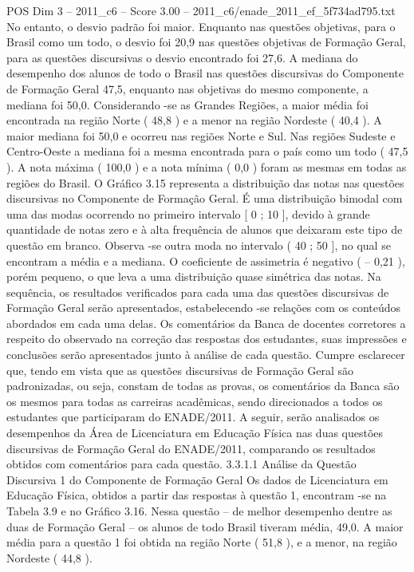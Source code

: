 \begin{textsample}{POS Dim 3 – 2011\_c6 – Score 3.00 – 2011\_c6/enade\_2011\_ef\_5f734ad795.txt}
No entanto, o desvio padrão foi maior.
Enquanto nas questões objetivas, para o Brasil como um todo, o desvio foi 20,9 nas questões objetivas de Formação Geral, para as questões discursivas o desvio encontrado foi 27,6.
A mediana do desempenho dos alunos de todo o Brasil nas questões discursivas do Componente de Formação Geral 47,5, enquanto nas objetivas do mesmo componente, a mediana foi 50,0.
Considerando -se as Grandes Regiões, a maior média foi encontrada na região Norte ( 48,8 ) e a menor na região Nordeste ( 40,4 ).
A maior mediana foi 50,0 e ocorreu nas regiões Norte e Sul.
Nas regiões Sudeste e Centro-Oeste a mediana foi a mesma encontrada para o país como um todo ( 47,5 ).
A nota máxima ( 100,0 ) e a nota mínima ( 0,0 ) foram as mesmas em todas as regiões do Brasil.
O Gráfico 3.15 representa a distribuição das notas nas questões discursivas no Componente de Formação Geral.
É uma distribuição bimodal com uma das modas ocorrendo no primeiro intervalo [ 0 ; 10 ], devido à grande quantidade de notas zero e à alta frequência de alunos que deixaram este tipo de questão em branco.
Observa -se outra moda no intervalo ( 40 ; 50 ], no qual se encontram a média e a mediana.
O coeficiente de assimetria é negativo ( – 0,21 ), porém pequeno, o que leva a uma distribuição quase simétrica das notas.
Na sequência, os resultados verificados para cada uma das questões discursivas de Formação Geral serão apresentados, estabelecendo -se relações com os conteúdos abordados em cada uma delas.
Os comentários da Banca de docentes corretores a respeito do observado na correção das respostas dos estudantes, suas impressões e conclusões serão apresentados junto à análise de cada questão.
Cumpre esclarecer que, tendo em vista que as questões discursivas de Formação Geral são padronizadas, ou seja, constam de todas as provas, os comentários da Banca são os mesmos para todas as carreiras acadêmicas, sendo direcionados a todos os estudantes que participaram do ENADE/2011.
A seguir, serão analisados os desempenhos da Área de Licenciatura em Educação Física nas duas questões discursivas de Formação Geral do ENADE/2011, comparando os resultados obtidos com comentários para cada questão. 3.3.1.1 Análise da Questão Discursiva 1 do Componente de Formação Geral Os dados de Licenciatura em Educação Física, obtidos a partir das respostas à questão 1, encontram -se na Tabela 3.9 e no Gráfico 3.16.
Nessa questão – de melhor desempenho dentre as duas de Formação Geral – os alunos de todo Brasil tiveram média, 49,0.
A maior média para a questão 1 foi obtida na região Norte ( 51,8 ), e a menor, na região Nordeste ( 44,8 ).

\end{textsample}

